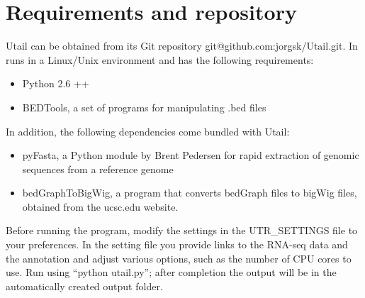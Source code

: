 \section{Requirements and repository}
Utail can be obtained from its Git repository git@github.com:jorgsk/Utail.git.
In runs in a Linux/Unix environment and has the following requirements:
\begin{itemize}
	\item Python 2.6 ++
	\item BEDTools, a set of programs for manipulating .bed files
		\cite{quinlan_bedtools:_2010}
\end{itemize}
In addition, the following dependencies come bundled with Utail:
\begin{itemize}
	\item pyFasta, a Python module by Brent Pedersen for rapid extraction of
		genomic sequences from a reference genome
	\item bedGraphToBigWig, a program that converts bedGraph files to bigWig
		files, obtained from the ucsc.edu website.
\end{itemize}
Before running the program, modify the settings in the UTR\_SETTINGS file to
your preferences. In the setting file you provide links to the RNA-seq data and
the annotation and adjust various options, such as the number of CPU cores to
use. Run using ``python utail.py''; after completion the output will be in the
automatically created output folder.
